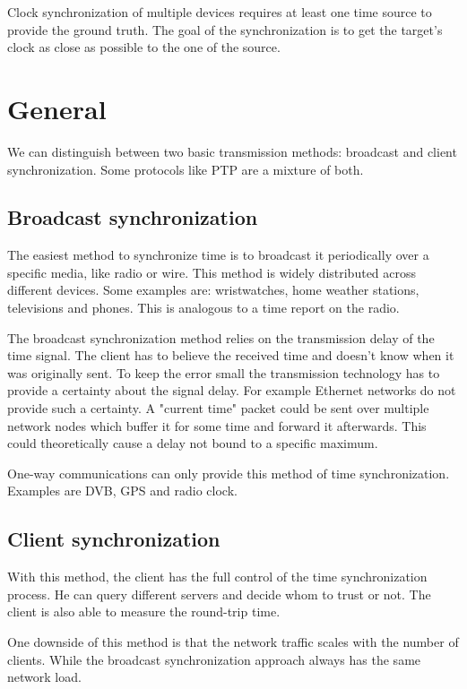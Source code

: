 Clock synchronization of multiple devices requires at least one time source to provide the ground truth. The goal of the synchronization is to get the target’s clock as close as possible to the one of the source.

\section{General}

We can distinguish between two basic transmission methods: broadcast and client synchronization. Some protocols like PTP are a mixture of both.

\subsection{Broadcast synchronization}

The easiest method to synchronize time is to broadcast it periodically over a specific media, like radio or wire. This method is widely distributed across different devices. Some examples are: wristwatches, home weather stations, televisions and phones. This is analogous to a time report on the radio.

The broadcast synchronization method relies on the transmission delay of the time signal. The client has to believe the received time and doesn’t know when it was originally sent. To keep the error small the transmission technology has to provide a certainty about the signal delay. For example Ethernet networks do not provide such a certainty. A "current time" packet could be sent over multiple network nodes which buffer it for some time and forward it afterwards. This could theoretically cause a delay not bound to a specific maximum.

One-way communications can only provide this method of time synchronization. Examples are DVB, GPS and radio clock.

\subsection{Client synchronization}

With this method, the client has the full control of the time synchronization process. He can query different servers and decide whom to trust or not. The client is also able to measure the round-trip time.

One downside of this method is that the network traffic scales with the number of clients. While the broadcast synchronization approach always has the same network load.


